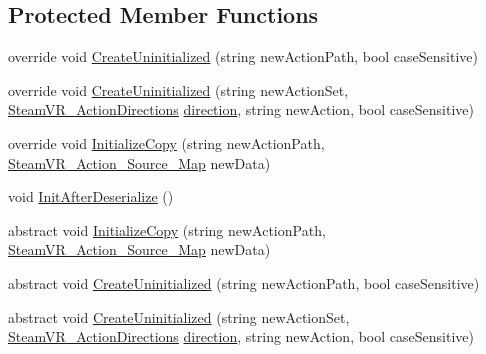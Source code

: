 \subsection*{Protected Member Functions}
\begin{DoxyCompactItemize}
\item 
override void \mbox{\hyperlink{class_valve_1_1_v_r_1_1_steam_v_r___action_af69bed4c4b5b9640c2cac9e118743df3}{Create\+Uninitialized}} (string new\+Action\+Path, bool case\+Sensitive)
\item 
override void \mbox{\hyperlink{class_valve_1_1_v_r_1_1_steam_v_r___action_a3ef78876da16318e17896536ae380e0a}{Create\+Uninitialized}} (string new\+Action\+Set, \mbox{\hyperlink{namespace_valve_1_1_v_r_a1e6192cb5ddaf204afab87ccb5728780}{Steam\+V\+R\+\_\+\+Action\+Directions}} \mbox{\hyperlink{class_valve_1_1_v_r_1_1_steam_v_r___action_aee8591fed8be32dde8c11ab75b830323}{direction}}, string new\+Action, bool case\+Sensitive)
\item 
override void \mbox{\hyperlink{class_valve_1_1_v_r_1_1_steam_v_r___action_af28d577bb913087c833873e4a66e9b2f}{Initialize\+Copy}} (string new\+Action\+Path, \mbox{\hyperlink{class_valve_1_1_v_r_1_1_steam_v_r___action___source___map}{Steam\+V\+R\+\_\+\+Action\+\_\+\+Source\+\_\+\+Map}} new\+Data)
\item 
void \mbox{\hyperlink{class_valve_1_1_v_r_1_1_steam_v_r___action_ac3195ebfd368a3ee5673d792b9e08eba}{Init\+After\+Deserialize}} ()
\item 
abstract void \mbox{\hyperlink{class_valve_1_1_v_r_1_1_steam_v_r___action_aee6486f13a4e850779f50c95725b30d0}{Initialize\+Copy}} (string new\+Action\+Path, \mbox{\hyperlink{class_valve_1_1_v_r_1_1_steam_v_r___action___source___map}{Steam\+V\+R\+\_\+\+Action\+\_\+\+Source\+\_\+\+Map}} new\+Data)
\item 
abstract void \mbox{\hyperlink{class_valve_1_1_v_r_1_1_steam_v_r___action_a973b707bcccec103ca220f9e06df8662}{Create\+Uninitialized}} (string new\+Action\+Path, bool case\+Sensitive)
\item 
abstract void \mbox{\hyperlink{class_valve_1_1_v_r_1_1_steam_v_r___action_ad2c8fc63857c6a6c9c551ec858797202}{Create\+Uninitialized}} (string new\+Action\+Set, \mbox{\hyperlink{namespace_valve_1_1_v_r_a1e6192cb5ddaf204afab87ccb5728780}{Steam\+V\+R\+\_\+\+Action\+Directions}} \mbox{\hyperlink{class_valve_1_1_v_r_1_1_steam_v_r___action_aee8591fed8be32dde8c11ab75b830323}{direction}}, string new\+Action, bool case\+Sensitive)
\end{DoxyCompactItemize}
